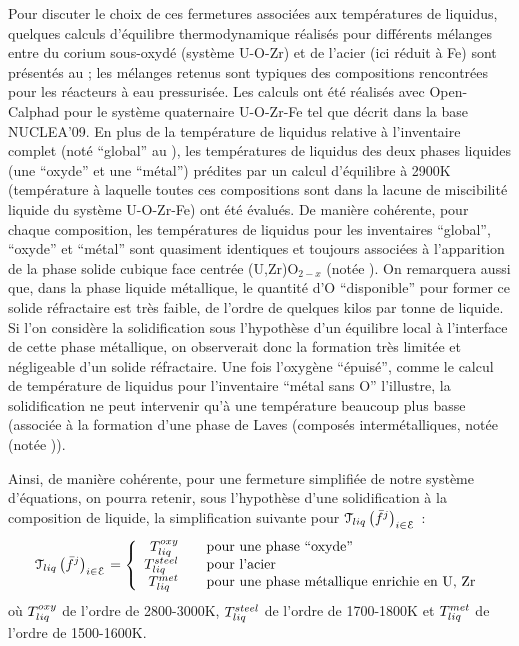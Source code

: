 Pour discuter le choix de ces fermetures associées aux températures de liquidus, quelques calculs d'équilibre thermodynamique réalisés pour différents mélanges entre du corium sous-oxydé (système U-O-Zr) et de l'acier (ici réduit à Fe) sont présentés au  ; les mélanges retenus sont typiques des compositions rencontrées pour les réacteurs à eau pressurisée. Les calculs ont été réalisés avec Open-Calphad pour le système quaternaire U-O-Zr-Fe tel que décrit dans la base NUCLEA'09. En plus de la température de liquidus relative à l'inventaire complet (noté ``global'' au ), les températures de liquidus des deux phases liquides (une ``oxyde'' et une ``métal'') prédites par un calcul d'équilibre à 2900K (température à laquelle toutes ces compositions sont dans la lacune de miscibilité liquide du système U-O-Zr-Fe) ont été évalués. De manière cohérente, pour chaque composition, les températures de liquidus pour les inventaires ``global'', ``oxyde'' et ``métal'' sont quasiment identiques et toujours associées à l'apparition de la phase solide cubique face centrée (U,Zr)O$_{2-x}$ (notée ). On remarquera aussi que, dans la phase liquide métallique, le quantité d'O ``disponible'' pour former ce solide réfractaire est très faible, de l'ordre de quelques kilos par tonne de liquide. Si l'on considère la solidification sous l'hypothèse d'un équilibre local à l'interface de cette phase métallique, on observerait donc la formation très limitée et négligeable d'un solide réfractaire. Une fois l'oxygène ``épuisé'', comme le calcul de température de liquidus pour l'inventaire ``métal sans O'' l'illustre, la solidification ne peut intervenir qu'à une température beaucoup plus basse (associée à la formation d'une phase de Laves (composés intermétalliques, notée (notée )).

Ainsi, de manière cohérente, pour une fermeture simplifiée de notre système d'équations, on pourra retenir, sous l'hypothèse d'une solidification à la composition de liquide, la simplification suivante pour $\Mc{T}_{liq}\left(\elementMassFraction[j]{}\right)_{i\in\elementSet}$ :
\begin{equation}
 \Mc{T}_{liq}\left(\elementMassFraction[j]{}\right)_{i\in\elementSet} = 
 \left\{\begin{array}{rcl} \temperature[oxy]{liq} & & \text{pour une phase ``oxyde''} \\
                           \temperature[steel]{liq} & & \text{pour l'acier} \\
                           \temperature[met]{liq} & & \text{pour une phase métallique enrichie en U, Zr} 
 \end{array}\right.
\end{equation}
où $\temperature[oxy]{liq}$ de l'ordre de 2800-3000K, $\temperature[steel]{liq}$ de l'ordre de 1700-1800K et $\temperature[met]{liq}$ de l'ordre de 1500-1600K.


